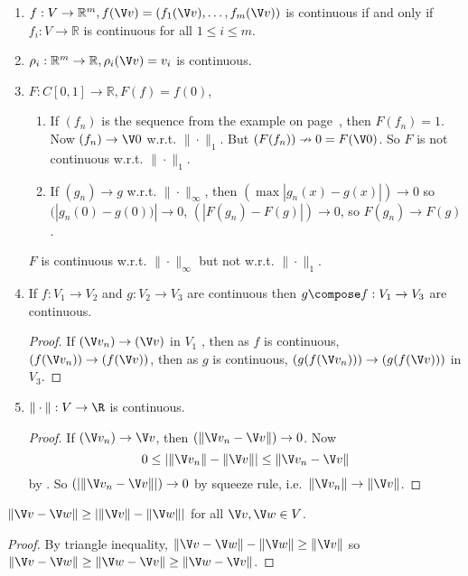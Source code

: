\documentclass[a4paper]{article}
\theoremstyle{definition}
\begin{document}
\begin{eg}\leavevmode
  \label{eg:continuity}
  \begin{enumerate}
  \item $f:V\to \mathbb{R}^m, f(\V v) = (f_1(\V v), \ldots, f_m(\V v))$ is continuous if and only if $f_i:V\to \mathbb{R}$ is continuous for all $1\leq i \leq m$.
  \item $\rho_i:\mathbb{R}^m\to \mathbb{R}, \rho_i(\V v) =v_i$ is continuous.
  \item $F:C[0,1]\to\mathbb{R}, F(f)=f(0)$,
    \begin{enumerate}
    \item If $(f_n)$ is the sequence from the example on page~\pageref{eg:fdown}, then $F(f_n)=1$. Now $(f_n)\to \V 0$ w.r.t. $\|\cdot\|_1$. But $(F(f_n))\nrightarrow 0=F(\V 0)$. So $F$ is not continuous w.r.t. $\|\cdot\|_1$.
      \item If $(g_n)\to g$ w.r.t. $\|\cdot\|_\infty$, then $(\max|g_n(x)-g(x)|)\to 0$ so $(|g_n(0)-g(0))|\to 0$, $(|F(g_n)-F(g)|)\to 0$, so $F(g_n)\to F(g)$.
    \end{enumerate}
    $F$ is continuous w.r.t. $\|\cdot\|_\infty$ but not w.r.t. $\|\cdot\|_1$.
  \item If $f:V_1\to V_2$ and $g:V_2\to V_3$ are continuous then $g\compose f: V_1\to V_3$ are continuous.
    \begin{proof}
      If $(\V v_n) \to (\V v)$ in $V_1$ , then as $f$ is continuous, $(f(\V v_n)) \to (f(\V v))$, then as $g$ is continuous, $(g(f(\V v_n))) \to (g(f(\V v)))$ in $V_3$.
    \end{proof}
  \item $\|\cdot\|: V \to \R$ is continuous.
    \begin{proof}
      If $(\V v_n)\to \V v$, then $(\|\V v_n - \V v\|) \to 0$. Now
    \[
      0 \leq |\|\V v_n\| - \|\V v\|| \leq \|\V v_n - \V v\|
    \]
    by . So $(|\|\V v_n - \V v\||) \to 0$ by squeeze rule, i.e.\ $\|\V v_n\| \to \|\V v\|$.
  \end{proof}
  \end{enumerate}
\end{eg}

\begin{lemma}
  \label{lem:alternate triangle}
  $\|\V v- \V w\| \geq |\|\V v\| - \|\V w\||$ for all $\V v, \V w \in V$.
\end{lemma}

\begin{proof}
  By triangle inequality, $\|\V v- \V w\| - \|\V w\| \geq \|\V v \|$ so $\|\V v - \V w\| \geq \|\V w - \V v\| \geq \|\V w - \V v\|$.
\end{proof}
\end{document}
